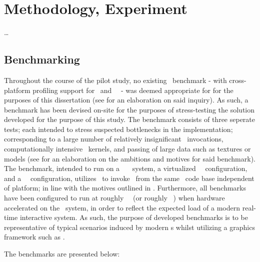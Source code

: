 
\chapter{Methodology, Experiment}
\label{cha:methodologyexperiment}
\ldots

\section{Benchmarking}
\label{sec:methodologyexperiment_benchmarking}
Throughout the course of the pilot study, no existing \dvttermopenglestwopointo\ benchmark - with cross-platform profiling support for \dvttermandroid\ and \dvttermxeleven\ \dvttermlinux\ - was deemed appropriate for for the purposes of this dissertation (see  for an elaboration on said inquiry).
As such, a benchmark has been devised on-site for the purposes of stress-testing the solution developed for the purpose of this study.
The benchmark consists of three seperate tests; each intended to stress suspected bottlenecks in the implementation; corresponding to a large number of relatively insignificant \dvttermopengl\ invocations, computationally intensive \dvttermgpu\ kernels, and passing of large data such as textures or models (see  for an elaboration on the ambitions and motives for said benchmark).
The benchmark, intended to run on a \dvttermhost\ \dvttermfedora\ \dvttermlinux\ system, a virtualized \dvttermsimics\ \dvttermfedora\ configuration, and a \dvttermqemu\ \dvttermandroid\ configuration, utilizes \dvttermjni\ to invoke \dvttermopengles\ from the same \dvttermc\ code base independent of platform; in line with the motives outlined in .
Furthermore, all benchmarks have been configured to run at roughly ~\milli\second\ (or roughly ~\dvttermfps ) when hardware accelerated on the \dvttermhost\ system, in order to reflect the expected load of a modern real-time interactive system.
As such, the purpose of developed benchmarks is to be representative of typical scenarios induced by modern \dvttermgui s whilst utilizing a graphics framework such as \dvttermopengl .

The benchmarks are presented below:


